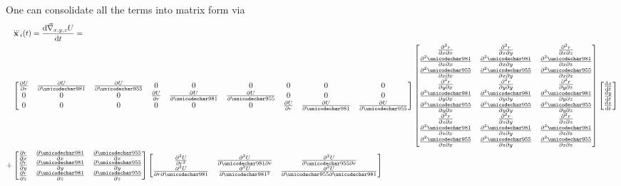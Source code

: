 One can consolidate all the terms into matrix form via
\begin{equation}
\begin{split}
 &\dddot{\vct{x}}_i(t) = \dtv{\del_{x,y,z}U}{\tparm} = \\
 &\begin{bmatrix}
  \prt{U}{r} & \prt{U}{\phi} & \prt{U}{\lambda} & 0 & 0 & 0 & 0 & 0 & 0\\
  0 & 0 & 0 & \prt{U}{r} & \prt{U}{\phi} & \prt{U}{\lambda} & 0 & 0 & 0\\
  0 & 0 & 0 & 0 & 0 & 0 & \prt{U}{r} & \prt{U}{\phi} & \prt{U}{\lambda} 
 \end{bmatrix}\begin{bmatrix}
  \prttwob{r}{x}{x} & \prttwob{r}{x}{y} & \prttwob{r}{x}{z}\\ 
  \prttwob{\phi}{x}{x} & \prttwob{\phi}{x}{y} & \prttwob{\phi}{x}{z}\\ 
  \prttwob{\lambda}{x}{x} & \prttwob{\lambda}{x}{y} & \prttwob{\lambda}{x}{z}\\
  \prttwob{r}{y}{x} & \prttwob{r}{y}{y} & \prttwob{r}{y}{z}\\ 
  \prttwob{\phi}{y}{x} & \prttwob{\phi}{y}{y} & \prttwob{\phi}{y}{z}\\ 
  \prttwob{\lambda}{y}{x} & \prttwob{\lambda}{y}{y} & \prttwob{\lambda}{y}{z}\\
  \prttwob{r}{z}{x} & \prttwob{r}{z}{y} & \prttwob{r}{z}{z}\\ 
  \prttwob{\phi}{z}{x} & \prttwob{\phi}{z}{y} & \prttwob{\phi}{z}{z}\\ 
  \prttwob{\lambda}{z}{x} & \prttwob{\lambda}{z}{y} & \prttwob{\lambda}{z}{z}
 \end{bmatrix}
 \begin{bmatrix}
  \dtv{x}{\tparm} \\ \dtv{y}{\tparm} \\ \dtv{z}{\tparm}  
 \end{bmatrix}\\
 +
 &\begin{bmatrix}
  \prt{r}{x} & \prt{\phi}{x} & \prt{\lambda}{x}\\
  \prt{r}{y} & \prt{\phi}{y} & \prt{\lambda}{y}\\
  \prt{r}{z} & \prt{\phi}{z} & \prt{\lambda}{z}
 \end{bmatrix}
 \begin{bmatrix}
  \prttwoa{U}{r} & \prttwob{U}{\phi}{r} & \prttwob{U}{\lambda}{r}\\
  \prttwob{U}{r}{\phi} & \prttwoa{U}{\phi} & \prttwob{U}{\lambda}{\phi}\\

\end{bmatrix}
\end{split}
\end{equation}
